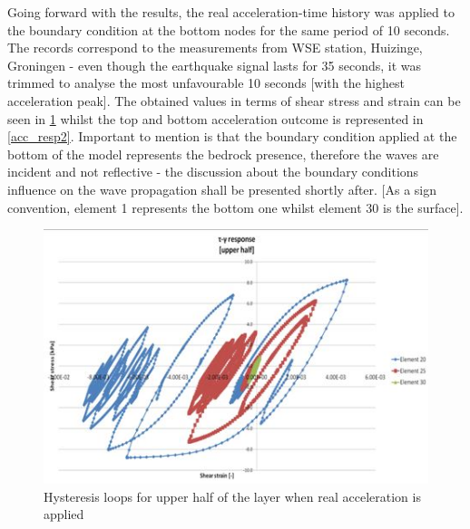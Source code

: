 	Going forward with the results, the real acceleration-time history was applied to the boundary condition at the bottom nodes for the same period of 10 seconds. The records correspond to the measurements from WSE station, Huizinge, Groningen \cite{dost2013august} - even though the earthquake signal lasts for 35 seconds, it was trimmed to analyse the most unfavourable 10 seconds [with the highest acceleration peak]. The obtained values in terms of shear stress and strain can be seen in \ref{resp3} whilst the top and bottom acceleration outcome is represented in \ref{acc_resp2}. Important to mention is that the boundary condition applied at the bottom of the model represents the bedrock presence, therefore the waves are incident and not reflective - the discussion about the boundary conditions influence on the wave propagation shall be presented shortly after. [As a sign convention, element 1 represents the bottom one whilst element 30 is the surface].
	\begin{figure} [h!]
		\centering
		\includegraphics[width=0.7\linewidth]{"response3"}
		\caption{Hysteresis loops for upper half of the layer when real acceleration is applied}
		\label{resp3}
	\end{figure}
	
